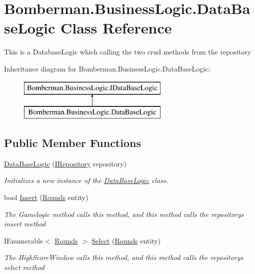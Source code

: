 \hypertarget{class_bomberman_1_1_business_logic_1_1_data_base_logic}{}\section{Bomberman.\+Business\+Logic.\+Data\+Base\+Logic Class Reference}
\label{class_bomberman_1_1_business_logic_1_1_data_base_logic}


This is a Database\+Logic which calling the two crud methods from the repository  


Inheritance diagram for Bomberman.\+Business\+Logic.\+Data\+Base\+Logic\+:\begin{figure}[H]
\begin{center}
\leavevmode
\includegraphics[height=2.000000cm]{class_bomberman_1_1_business_logic_1_1_data_base_logic}
\end{center}
\end{figure}
\subsection*{Public Member Functions}
\begin{DoxyCompactItemize}
\item 
\mbox{\hyperlink{class_bomberman_1_1_business_logic_1_1_data_base_logic_a5e835cdb14e199501fee1aa6c642873e}{Data\+Base\+Logic}} (\mbox{\hyperlink{interface_bomberman_1_1_repository_1_1_i_repository}{I\+Repository}} repository)
\begin{DoxyCompactList}\small\item\em Initializes a new instance of the \mbox{\hyperlink{class_bomberman_1_1_business_logic_1_1_data_base_logic}{Data\+Base\+Logic}} class. \end{DoxyCompactList}\item 
bool \mbox{\hyperlink{class_bomberman_1_1_business_logic_1_1_data_base_logic_a6a7ca20f6210022d6b45d3aba0e17a62}{Insert}} (\mbox{\hyperlink{class_bomberman_1_1_data_1_1_rounds}{Rounds}} entity)
\begin{DoxyCompactList}\small\item\em The Gamelogic method calls this method, and this method calls the repository\textquotesingle{}s insert method \end{DoxyCompactList}\item 
I\+Enumerable$<$ \mbox{\hyperlink{class_bomberman_1_1_data_1_1_rounds}{Rounds}} $>$ \mbox{\hyperlink{class_bomberman_1_1_business_logic_1_1_data_base_logic_a7535cc3e0b6ea882d06a83a07ab4e083}{Select}} (\mbox{\hyperlink{class_bomberman_1_1_data_1_1_rounds}{Rounds}} entity)
\begin{DoxyCompactList}\small\item\em The High\+Score\+Window calls this method, and this method calls the repository\textquotesingle{}s select method \end{DoxyCompactList}\end{DoxyCompactItemize}
